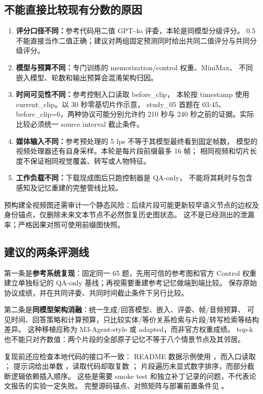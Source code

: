 \subsection{不能直接比较现有分数的原因}
\begin{enumerate}
\item \textbf{评分口径不同：}参考代码用二值 GPT-4o 评委，本轮是同模型分级评分。
0.5 不能直接当作二值正确；建议对两组固定预测同时给出共同二值评分与共同分级评分。
\item \textbf{模型与预算不同：}专门训练的 memorization/control 权重、MiniMax、
不同嵌入模型、轮数和输出预算会混淆架构归因。
\item \textbf{时间可见性不同：}参考控制入口读取 before\_clip，
本轮按 timestamp 使用 current\_clip。以 30 秒零基切片作示意，
study\_05 首题在 03:45、before\_clip=6，两种协议可能分别允许约 210 秒与
240 秒之前的证据。实际比较必须统一 source interval 截止条件。
\item \textbf{媒体输入不同：}参考预处理的 5 fps 不等于其模型最终看到固定帧数，
模型的视频处理器还有自身采样。本轮是每片段前缀最多 16 帧；
相同视频和切片长度不保证相同视觉覆盖、转写或人物特征。
\item \textbf{工作负载不同：}下载现成图后只跑控制器是 QA-only，
不能将其耗时与包含感知及记忆重建的完整管线比较。
\end{enumerate}

预构建全视频图还需审计一个静态风险：后续片段可能更新较早语义节点的边权及
身份锚点，仅删除未来文本节点不必然恢复历史图状态。
这不是已经测出的泄漏率；严格因果对照可使用前缀图快照。

\subsection{建议的两条评测线}
第一条是\textbf{参考系统复现}：固定同一 65 题，先用可信的参考图和官方
Control 权重建立单独标记的 QA-only 基线；再视需要重建参考记忆做端到端比较。
保存原始协议成绩，并在共同评委、共同时间截止条件下另行比较。

第二条是\textbf{同模型架构消融}：统一生成/回答模型、嵌入、评委、帧/音频预算、
可见时间、回答策略和计算预算，只比较实体/等价关系检索与片段/转写检索等结构差异。
这种移植应称为 M3-Agent-style 或 adapted，而非官方权重成绩。
top-k 也不能只对齐数值：两个片段的全部原子记忆不等于八个情景节点及其邻居。

复现前还应检查本地代码的接口不一致：
README 数据示例使用 ，而入口读取 ；
提示词给出单数 ，读取代码却取复数 ；
片段遍历未显式数字排序，而部分截断逻辑依赖插入顺序。
这些是需要 smoke test 和独立补丁记录的问题，不代表论文报告的实验一定失败。
完整源码锚点、对照矩阵与部署前置条件见
。
